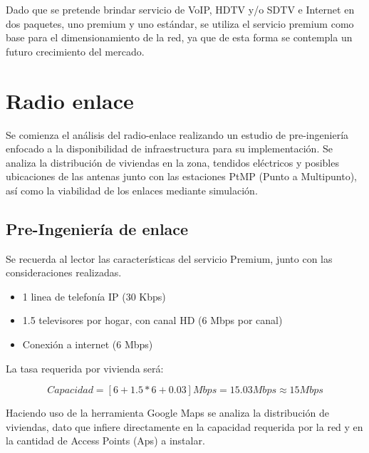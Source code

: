 \documentclass[12pt,a4paper]{book}
\begin{document}
 \medskip

Dado que se pretende brindar servicio de VoIP, HDTV y/o SDTV e Internet en dos paquetes, uno premium y uno estándar, se utiliza el servicio premium como base para el dimensionamiento de la red, ya que de esta forma se contempla un futuro crecimiento del mercado.

\medskip

\section{Radio enlace}\label{sec_radio_enlace_acc}

\medskip

Se comienza el análisis del radio-enlace realizando un estudio de pre-ingeniería enfocado a la disponibilidad de infraestructura para su implementación. Se analiza la distribución de viviendas en la zona, tendidos eléctricos y posibles ubicaciones de las antenas junto con las estaciones PtMP (Punto a Multipunto), así como la viabilidad de los enlaces mediante simulación.

\medskip

\subsection{Pre-Ingeniería de enlace}\label{subsec_acceso_pre_ing_enlace}

\medskip

Se recuerda al lector las características del servicio Premium, junto con las consideraciones realizadas.

\medskip

\begin{itemize}
\item 1 linea de telefonía IP (30 Kbps)
\item 1.5 televisores por hogar, con canal HD (6 Mbps por canal)
\item Conexión a internet (6 Mbps)
\end{itemize}

\medskip

La tasa requerida por vivienda será:

\medskip

\begin{equation}\label{ec_capacidad_premium}
Capacidad = [ 6 + 1.5 * 6 + 0.03] Mbps = 15.03 Mbps \approx 15 Mbps
\end{equation}

\medskip

Haciendo uso de la herramienta Google Maps se analiza la distribución de viviendas, dato que infiere directamente en la capacidad requerida por la red y en la cantidad de Access Points (Aps) a instalar.
\end{document}
